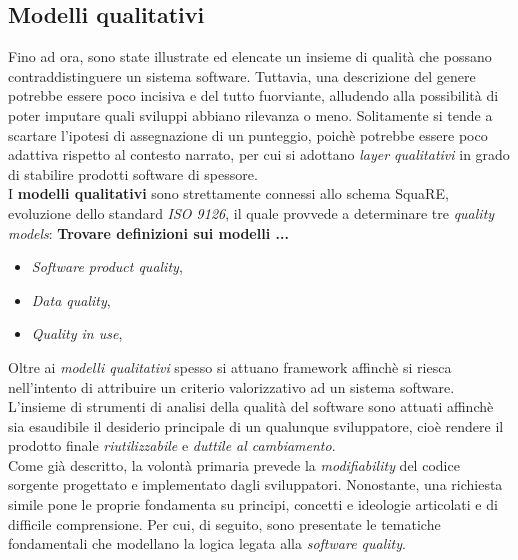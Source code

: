\documentclass{article}
\begin{document}
\subsection*{Modelli qualitativi}
\large
Fino ad ora, sono state illustrate ed elencate un insieme di qualità che possano contraddistinguere un sistema software. Tuttavia, una descrizione del genere potrebbe essere poco incisiva e del tutto fuorviante, alludendo alla possibilità di poter imputare quali sviluppi abbiano rilevanza o meno. Solitamente si tende a scartare l'ipotesi di assegnazione di un punteggio, poichè potrebbe essere poco adattiva rispetto al contesto narrato, per cui si adottano \textit{layer qualitativi} in grado di stabilire prodotti software di spessore.\vspace*{14pt}\\
I \textbf{modelli qualitativi} sono strettamente connessi allo schema SquaRE, evoluzione dello standard \textit{ISO 9126}, il quale provvede a determinare tre \textit{quality models}: \textbf{Trovare definizioni sui modelli ...}
\begin{itemize}[label={-}]
    \itemsep0em
    \item \textit{Software product quality}, 
    \item \textit{Data quality},
    \item \textit{Quality in use},
\end{itemize} 
Oltre ai \textit{modelli qualitativi} spesso si attuano framework affinchè si riesca nell'intento di attribuire un criterio valorizzativo ad un sistema software. L'insieme di strumenti di analisi della qualità del software sono attuati affinchè sia esaudibile il desiderio principale di un qualunque sviluppatore, cioè rendere il prodotto finale \textit{riutilizzabile} e \textit{duttile al cambiamento}.\vspace*{14pt}\\
Come già descritto, la volontà primaria prevede la \textit{modifiability} del codice sorgente progettato e implementato dagli sviluppatori. Nonostante, una richiesta simile pone le proprie fondamenta su principi, concetti e ideologie articolati e di difficile comprensione. Per cui, di seguito, sono presentate le tematiche fondamentali che modellano la logica legata alla \textit{software quality}.
\end{document}
